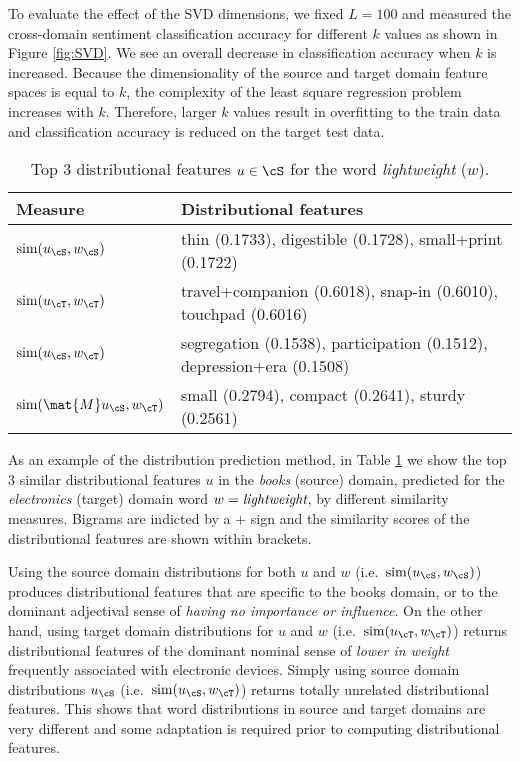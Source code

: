 \documentclass[11pt]{article}
\begin{document}
To evaluate the effect of the SVD dimensions, we fixed $L=100$ and measured the cross-domain sentiment
classification accuracy for different $k$ values as shown in Figure \ref{fig:SVD}.
We see an overall decrease in classification accuracy when $k$ is increased. 
Because the dimensionality of the source and target domain feature spaces is equal to $k$,
the complexity of the least square regression problem increases with $k$.
Therefore, larger $k$ values result in overfitting to the train data and classification accuracy is reduced
on the target test data.

\begin{table}
\small
\begin{center}
\begin{tabular}{|p{2cm}|p{5cm}|} \hline
Measure								& Distributional features \\ \hline \hline
${\rm sim}(u_{\cS}, w_{\cS})$ 			& 	thin (0.1733), 	digestible (0.1728), small+print (0.1722)	\\
${\rm sim}(u_{\cT}, w_{\cT})$  			&	travel+companion (0.6018), snap-in (0.6010), touchpad (0.6016) \\
${\rm sim}(u_{\cS}, w_{\cT})$			& 	segregation (0.1538), participation (0.1512), depression+era (0.1508)\\
${\rm sim}(\mat{M} u_{\cS}, w_{\cT})$   	& 	small (0.2794), compact (0.2641), sturdy (0.2561)\\ \hline
\end{tabular}
\end{center}
\caption{Top $3$ distributional features $u \in \cS$ for the word \textit{lightweight} ($w$).}
\label{tbl:neighbours}
\end{table}


As an example of the distribution prediction method, 
in Table \ref{tbl:neighbours} we show the top $3$ similar distributional features $u$ in the \textit{books} (source) domain, 
predicted for the \textit{electronics} (target) domain word $w = {\rm \textit{lightweight}}$, by 
different similarity measures. Bigrams are indicted by a $+$ sign and the similarity scores
of the distributional features are shown within brackets. 

Using the source domain distributions for both $u$ and $w$ (i.e.\ ${\rm sim}(u_{\cS}, w_{\cS})$) produces
distributional features that are specific to the books domain, or to the  dominant adjectival sense of 
\textit{having no importance or influence}.
On the other hand, using target domain distributions for $u$ and $w$  (i.e.\ ${\rm sim}(u_{\cT}, w_{\cT})$) 
returns distributional features
of the dominant nominal sense of \textit{lower in weight} frequently associated with electronic devices.
Simply using source domain distributions $u_{\cS}$ (i.e.\ ${\rm sim}(u_{\cS}, w_{\cT})$)
returns totally unrelated distributional features.
This shows that word distributions in source and target domains are
very different and some adaptation is required prior to computing distributional features.
\end{document}
